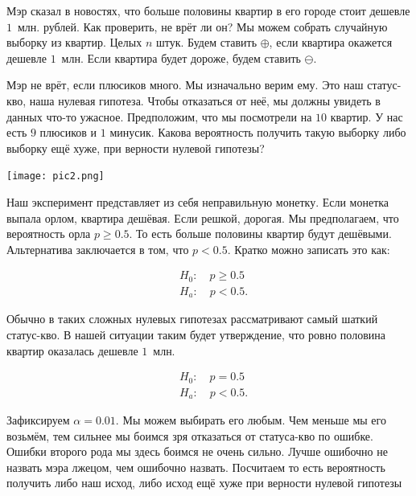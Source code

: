 \documentclass[12pt, a4paper, oneside]{article}
\begin{document}
Мэр сказал в новостях, что больше половины квартир в его городе стоит дешевле $1$~млн. рублей. Как проверить, не врёт ли он? Мы можем собрать случайную выборку из квартир. Целых $n$ штук. Будем ставить $\oplus$, если квартира окажется дешевле $1$~млн. Если квартира будет дороже, будем ставить $\ominus$. 

Мэр не врёт, если плюсиков много. Мы изначально верим ему. Это наш статус-кво, наша нулевая гипотеза. Чтобы отказаться от неё, мы должны увидеть в данных что-то ужасное. Предположим, что мы посмотрели на $10$ квартир. У нас есть $9$ плюсиков и $1$ минусик. Какова вероятность получить такую выборку либо выборку ещё хуже, при верности нулевой гипотезы? 

\begin{center} 
\texttt{[image: pic2.png]}
\end{center} 

Наш эксперимент представляет из себя неправильную монетку. Если монетка выпала орлом, квартира дешёвая. Если решкой, дорогая. Мы предполагаем, что вероятность орла $p \ge 0.5$. То есть больше половины квартир будут дешёвыми. Альтернатива заключается в том, что $p < 0.5$.  Кратко можно записать это как: 

\begin{equation*} 
    \begin{aligned} 
        &H_0: \quad p \ge 0.5 \\
        &H_a: \quad p < 0.5.
    \end{aligned} 
\end{equation*}

Обычно в таких сложных нулевых гипотезах рассматривают самый шаткий статус-кво. В нашей ситуации таким будет утверждение, что ровно половина квартир оказалась дешевле $1$~млн.

\begin{equation*} 
    \begin{aligned} 
        &H_0: \quad p = 0.5 \\
        &H_a: \quad p < 0.5.
    \end{aligned} 
\end{equation*}

Зафиксируем  $\alpha = 0.01.$ Мы можем выбирать его любым. Чем меньше мы его возьмём, тем сильнее мы боимся зря отказаться от статуса-кво по ошибке. Ошибки второго рода мы здесь боимся не очень сильно. Лучше ошибочно не назвать мэра лжецом, чем ошибочно назвать. Посчитаем  то есть вероятность получить либо наш исход, либо исход ещё хуже при верности нулевой гипотезы 
\end{document}
